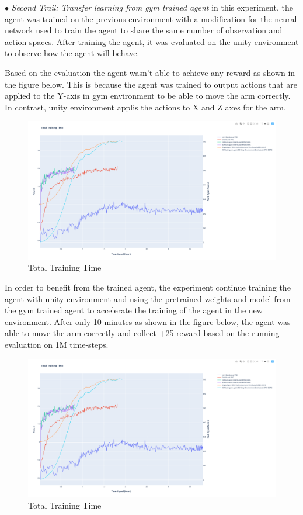 $\bullet$ \textit{Second Trail: Transfer learning from gym trained agent} in this experiment, the agent was trained on the previous environment with a modification for the neural network used to train the agent to share the same number of observation and action spaces. After training the agent, it was evaluated on the unity environment to observe how the agent will behave.

Based on the evaluation the agent wasn't able to achieve any reward as shown in the figure below. This is because the agent was trained to output actions that are applied to the Y-axis in gym environment to be able to move the arm correctly. In contrast, unity environment applis the actions to X and Z axes for the arm.
\begin{figure}[!htb]
		\centering
		\includegraphics[width=0.8\linewidth]{figures/exps/4th_exp/total_training_time.png}
		\caption{Total Training Time}
		\label{fig:4th_exp_total_training_time}
\end{figure}

In order to benefit from the trained agent, the experiment continue training the agent with unity environment and using the pretrained weights and model from the gym trained agent to accelerate the training of the agent in the new environment. After only 10 minutes as shown in the figure below, the agent was able to move the arm correctly and collect +25 reward based on the running evaluation on 1M time-steps.
\begin{figure}[!htb]
		\centering
		\includegraphics[width=0.8\linewidth]{figures/exps/4th_exp/total_training_time.png}
		\caption{Total Training Time}
		\label{fig:4th_exp_total_training_time}
\end{figure}



